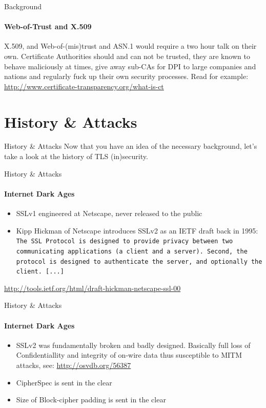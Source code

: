 \documentclass[hyperref={draft}]{beamer}
\begin{document}
\begin{frame}{Background}
  \framesubtitle{Web-of-Trust and X.509}
  X.509, and Web-of-(mis)trust and ASN.1 would require a two hour talk on their own.
  \newline
  \newline
  Certificate Authorities should and can not be trusted, they are known to behave maliciously at times, give away sub-CAs for DPI to large companies and nations and regularly fuck up their own security processes.
  \newline
  \newline
  Read for example: \url{http://www.certificate-transparency.org/what-is-ct}
\end{frame}


\section{History \& Attacks}

\begin{frame}{History \& Attacks}
  Now that you have an idea of the necessary background, let's take a look at the history of TLS (in)security. 
\end{frame}

\begin{frame}{History \& Attacks}
  \framesubtitle{Internet Dark Ages}
  \begin{itemize}
    \item SSLv1 engineered at Netscape, never released to the public
    \item Kipp Hickman of Netscape introduces SSLv2 as an IETF draft back in 1995:
      \newline
      \newline
      \texttt{The SSL Protocol is designed to provide privacy between two communicating applications (a client and a server). Second, the protocol is designed to authenticate the server, and optionally the client. [...]}
  \end{itemize}
  \vspace{50px}

  \tiny\url{http://tools.ietf.org/html/draft-hickman-netscape-ssl-00}
\end{frame}

\begin{frame}{History \& Attacks}
  \framesubtitle{Internet Dark Ages}
  \begin{itemize}
    \item SSLv2 was fundamentally broken and badly designed. Basically full loss of Confidentiallity and integrity of on-wire data thus susceptible to MITM attacks, see: \url{http://osvdb.org/56387}
    \item CipherSpec is sent in the clear
    \item Size of Block-cipher padding is sent in the clear
  \end{itemize}
\end{frame}
\end{document}
